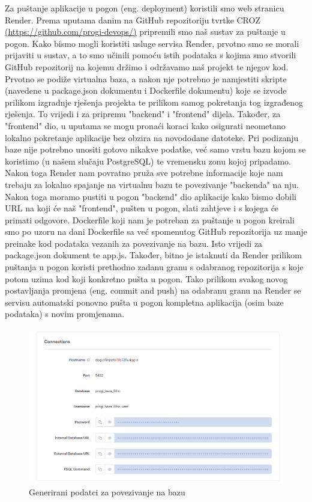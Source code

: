			Za puštanje aplikacije u pogon (eng. deployment) koristili smo web stranicu Render.
			Prema uputama danim na GitHub repozitoriju tvrtke CROZ \url{(https://github.com/progi-devops/)} pripremili smo naš sustav za puštanje u pogon.
			Kako bismo mogli koristiti usluge servisa Render, prvotno smo se morali prijaviti u sustav, a to smo učinili pomoću istih podataka s kojima smo stvorili GitHub repozitorij na kojemu držimo i održavamo naš projekt te njegov kod. Prvotno se podiže virtualna baza, a nakon nje potrebno je namjestiti skripte (navedene u package.json dokumentu i Dockerfile dokumentu) koje se izvode prilikom izgradnje rješenja projekta te prilikom samog pokretanja tog izgrađenog rješenja. To vrijedi i za pripremu "backend" i "frontend" dijela. Također, za "frontend" dio, u uputama se mogu pronaći koraci kako osigurati neometano lokalno pokretanje aplikacije bez obzira na novododane datoteke. Pri podizanju baze nije potrebno unositi gotovo nikakve podatke, već samo vrstu bazu kojom se koristimo (u našem slučaju PostgreSQL) te vremensku zonu kojoj pripadamo. Nakon toga Render nam povratno pruža sve potrebne informacije koje nam trebaju za lokalno spajanje na virtualnu bazu te povezivanje "backenda" na nju. Nakon toga moramo pustiti u pogon "backend" dio aplikacije kako bismo dobili URL na koji će naš "frontend", pušten u pogon, slati zahtjeve i s kojega će primati odgovore. Dockerfile koji nam je potreban za puštanje u pogon kreirali smo po uzoru na dani Dockerfile sa već spomenutog GitHub repozitorija uz manje preinake kod podataka vezanih za povezivanje na bazu. Isto vrijedi za package.json dokument te app.js. Također, bitno je istaknuti da Render prilikom puštanja u pogon koristi prethodno zadanu granu s odabranog repozitorija s koje potom uzima kod koji konkretno pušta u pogon. Tako prilikom svakog novog postavljanja promjena (eng. commit and push) na odabranu granu na Render se servisu automatski ponovno pušta u pogon kompletna aplikacija (osim baze podataka) s novim promjenama.
			
			\begin{figure}[H]
				\includegraphics[width=\textwidth]{slike/DB_podatci.png} %
				\caption{Generirani podatci za povezivanje na bazu}
				\label{fig:DB_podatci} %
			\end{figure}
			
